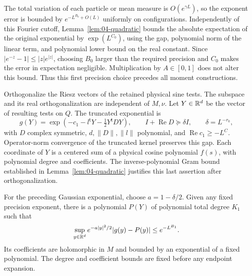 The total variation of each particle or mean measure is
\(O(e^{\gamma L})\), so the exponent error is bounded by
\(e^{-L^{B_0}+O(L)}\) uniformly on configurations. Independently of
this Fourier cutoff, Lemma~\ref{lem:04-quadratic} bounds the absolute
expectation of the original exponential by \(\exp(L^{C_0})\), using
the gap, polynomial norm of the linear term, and polynomial lower
bound on the real constant. Since
\(|e^{-z}-1|\le |z|e^{|z|}\), choosing \(B_0\) larger than the
required precision and \(C_0\) makes the error in expectation
negligible. Multiplication by \(A\in[0,1]\) does not alter this bound.
Thus this first precision choice precedes all moment constructions.

Orthogonalize the Riesz vectors of the retained physical sine tests.
The subspace and its real orthogonalization are independent of
\(M,\nu\). Let \(Y\in\mathbb R^d\) be the vector of resulting tests on
\(Q\). The truncated exponential is
\[
 g(Y)=\exp(-c_1-l^{\mathsf t}Y-\tfrac12Y^{\mathsf t}DY),
 \qquad I+\operatorname{Re}D\succeq\delta I,
 \qquad \delta=L^{-r_0},
\]
with \(D\) complex symmetric, \(d,\|D\|,\|l\|\) polynomial, and
\(\operatorname{Re}c_1\ge-L^C\). Operator-norm convergence of the
truncated kernel preserves this gap. Each coordinate of \(Y\) is a
centered sum of a physical cosine polynomial \(f(s)\), with
polynomial degree and coefficients. The inverse-polynomial Gram
bound established in Lemma~\ref{lem:04-quadratic} justifies this last
assertion after orthogonalization.

\begin{lemma}\label{lem:04-hermite}
For the preceding Gaussian exponential, choose \(a=1-\delta/2\).
Given any fixed precision exponent, there is a polynomial \(P(Y)\)
of polynomial total degree \(K_1\) such that
\[
 \sup_{y\in\mathbb R^d}e^{-a|y|^2/2}|g(y)-P(y)|\le e^{-L^{B_1}}.
\]
Its coefficients are holomorphic in \(M\) and bounded by an
exponential of a fixed polynomial. The degree and coefficient bounds
are fixed before any endpoint expansion.
\end{lemma}

